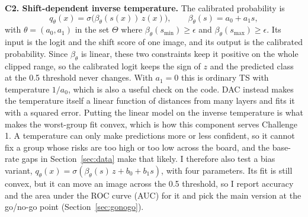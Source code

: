 \documentclass[sigconf,nonacm]{acmart}
\begin{document}
\textbf{C2. Shift-dependent inverse temperature.} The calibrated probability is
\begin{equation}
  q_\theta(x) = \sigma\big(\beta_\theta(s(x))\, z(x)\big), \qquad \beta_\theta(s) = a_0 + a_1 s,
  \label{eq:calib}
\end{equation}
with $\theta = (a_0, a_1)$ in the set $\Theta$ where $\beta_\theta(s_{\min}) \geq \epsilon$ and $\beta_\theta(s_{\max}) \geq \epsilon$. Its input is the logit and the shift score of one image, and its output is the calibrated probability. Since $\beta_\theta$ is linear, these two constraints keep it positive on the whole clipped range, so the calibrated logit keeps the sign of $z$ and the predicted class at the 0.5 threshold never changes. With $a_1 = 0$ this is ordinary TS with temperature $1/a_0$, which is also a useful check on the code. DAC instead makes the temperature itself a linear function of distances from many layers and fits it with a squared error. Putting the linear model on the inverse temperature is what makes the worst-group fit convex, which is how this component serves Challenge 1. A temperature can only make predictions more or less confident, so it cannot fix a group whose risks are too high or too low across the board, and the base-rate gaps in Section~\ref{sec:data} make that likely. I therefore also test a bias variant, $q_\theta(x) = \sigma(\beta_\theta(s)\, z + b_0 + b_1 s)$, with four parameters. Its fit is still convex, but it can move an image across the 0.5 threshold, so I report accuracy and the area under the ROC curve (AUC) for it and pick the main version at the go/no-go point (Section~\ref{sec:gonogo}).
\end{document}

